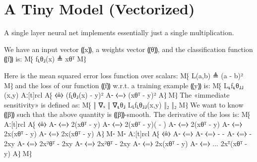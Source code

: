 \documentclass{article}
\begin{document}
\section{A Tiny Model (Vectorized)}

A single layer neural net implements essentially just a single multiplication.

We have an input vector ⸨x⸩, a weights vector ⸨θ⸩, and the
classification function ⸨f⸩ is:
M⁅ f⸤θ⸥(x) ≜ xθᵀ M⁆

Here is the mean squared error loss function over scalars:
M⁅ L(a,b) ≜ (a - b)² M⁆
and the loss of our function ⸨f⸩ {w.r.t.} a training example ⸨y⸩ is:
M⁅ L⸤f⸤θ⸥⸥(x,y) Aː[t]rcl
                A⁅ ⧼≜⧽ (f⸤θ⸥(x) - y)² 
                A⁃ ⧼=⧽ (xθᵀ - y)²
                A⁆
M⁆
The «immediate sensitivity» is defined as:
M⁅ ‖ ∇ₓ ‖ ∇⸤θ⸥ L⸤f⸤θ⸥⸥(x,y) ‖₂ ‖₂
M⁆
We want to know ⸨β⸩ such that the above quantity is ⸨β⸩-smooth.
The derivative of the loss is:
M⁅  Aː[t]rcl
                             A⁅ ⧼≜⧽ 
                             A⁃ ⧼=⧽ 2(xθᵀ - y)
                             A⁃ ⧼=⧽ 2(xθᵀ - y)( - )
                             A⁃ ⧼=⧽ 2(xθᵀ - y)
                             A⁃ ⧼=⧽ 2x(xθᵀ - y)
                             A⁃ ⧼=⧽ 2x(xθᵀ - y)
                             A⁆
M⁃
M⁃  Aː[t]rcl
                             A⁅ ⧼≜⧽ 
                             A⁃ ⧼=⧽ 
                             A⁃ ⧼=⧽  -  - 
                             A⁃ ⧼=⧽  - 2xy
                             A⁃ ⧼=⧽ 2x²θᵀ - 2xy
                             A⁃ ⧼=⧽ 2x²θᵀ - 2xy
                             A⁃ ⧼=⧽ 2x(xθᵀ - y)
                             A⁃ ⧼=⧽ ... 2xᵀ(xθᵀ - y)
                             A⁆
M⁆
\end{document}
